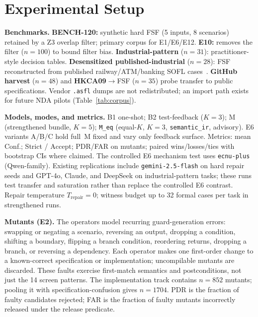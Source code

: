 \documentclass[10pt,conference]{IEEEtran}
\newcommand{\runin}[1]{\medskip\noindent\textbf{#1}\enspace}
\begin{document}
\section{Experimental Setup}
\runin{Benchmarks.}
\textbf{BENCH-120:} synthetic hard FSF (5 inputs, 8 scenarios) retained by a Z3
overlap filter; primary corpus for E1/E6/E12.
\textbf{E10:} removes the filter ($n{=}100$) to bound filter bias.
\textbf{Industrial-pattern} ($n{=}31$): practitioner-style decision tables.
\textbf{Desensitized published-industrial} ($n{=}28$): FSF reconstructed from
published railway/ATM/banking SOFL
cases~\cite{liu1998railwaycrossing,luo2017railway,liu2004soflbook}.
\textbf{GitHub harvest} ($n{=}48$) and \textbf{HKCA09}$\rightarrow$FSF
($n{=}35$) probe transfer to public specifications.
Vendor \texttt{.asfl} dumps are not redistributed; an import path exists for
future NDA pilots (Table~\ref{tab:corpus}).

\runin{Models, modes, and metrics.}
B1 one-shot; B2 test-feedback ($K{=}3$); M (strengthened bundle, $K{=}5$);
\texttt{M\_eq} (equal-$K$, $K{=}3$, \texttt{semantic\_ir}, advisory).
E6 variants A/B/C hold full~M fixed and vary only feedback surface.
Metrics: mean Conf.; Strict / $\mathrm{Accept}$; PDR/FAR on mutants; paired
wins/losses/ties with bootstrap CIs where claimed.
The controlled E6 mechanism test uses \texttt{ecnu-plus} (Qwen-family).
Existing replications include \texttt{gemini-2.5-flash} on hard repair seeds
and GPT-4o, Claude, and DeepSeek on industrial-pattern tasks; these runs test
transfer and saturation rather than replace the controlled E6 contrast.
Repair temperature $T_\text{repair}{=}0$; witness budget up to 32 formal cases
per task in strengthened runs.

\runin{Mutants (E2).}
The operators model recurring guard-generation errors: swapping or negating a
scenario, reversing an output, dropping a condition, shifting a boundary,
flipping a branch condition, reordering returns, dropping a branch, or
reversing a dependency.
Each operator makes one first-order change to a
known-correct specification or implementation; uncompilable mutants are
discarded.
These faults exercise first-match semantics and postconditions,
not just the 14 screen patterns.
The implementation track contains
$n{=}852$ mutants; pooling it with specification-confusion gives $n{=}1704$.
PDR is the fraction of faulty candidates rejected; FAR is the fraction of
faulty mutants incorrectly released under the release predicate.
\end{document}
